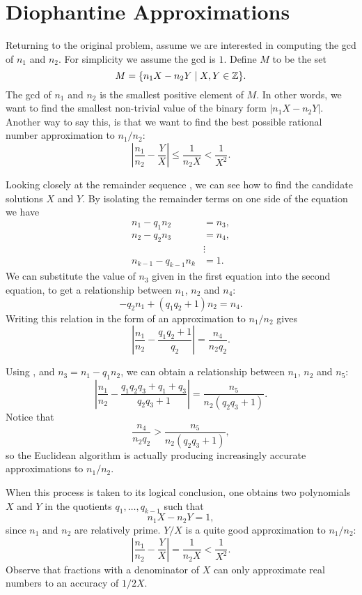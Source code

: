 
\section{Diophantine Approximations}
\label{Euclid:DA:Sec}

Returning to the original problem, assume we are interested in
computing the {\sc gcd} of $n_1$ and $n_2$.  For simplicity we assume
the {\sc gcd} is $1$.  Define $M$ to be the set
\[
M = \{ n_1 X - n_2 Y \mid X, Y \in \mathbb{Z} \}.
\]
The {\sc gcd} of $n_1$ and $n_2$ is the smallest positive element of $M$.
In other words, we want to find the smallest non-trivial value of the
binary form $|n_1 X - n_2 Y|$.  Another way to say this, is that we want
to find the best possible rational number approximation to $n_1/n_2$:
\[
\left|\frac{n_1}{n_2} - \frac{Y}{X}\right| \le \frac{1}{n_2 X} < \frac{1}{X^2}.
\]

Looking closely at the remainder sequence , we can see how to find
the candidate solutions $X$ and $Y$.  By isolating the remainder terms
on one side of the equation we have
\[
  \begin{aligned}
    n_1 - q_1 n_2 &= n_3,\\
    n_2 - q_2 n_3 &= n_4,\\
     &\vdots\\
    n_{k-1} - q_{k-1} n_{k} &= 1.
  \end{aligned}
\]
We can substitute the value of $n_3$ given in the first equation into
the second equation, to get a relationship between $n_1$, $n_2$ and
$n_4$:
\begin{equation}\label{Euclid:Int:D:Eq}
-q_2 n_1 + (q_1 q_2 + 1) n_2 = n_4.
\end{equation}
Writing this relation in the form of an approximation to $n_1/n_2$  gives
\[
\left|\frac{n_1}{n_2} - \frac{q_1 q_2 + 1}{q_2}\right| 
= \frac{n_4}{n_2 q_2}.
\]

Using , and $n_3 = n_1 - q_1 n_2$, we can
obtain a relationship between $n_1$, $n_2$ and $n_5$:
\[
\left|\frac{n_1}{n_2} - \frac{q_1 q_2 q_3 + q_1 + q_3}{q_2 q_3 +1 }\right| 
= \frac{n_5}{n_2 (q_2 q_3 +1)}.
\]
Notice that 
\[
\frac{n_4}{n_2 q_2} > \frac{n_5}{n_2 (q_2 q_3 +1)},
\]
so the Euclidean algorithm is actually producing increasingly accurate
approximations to $n_1/n_2$.

When this process is taken to its logical conclusion, one obtains two
polynomials $X$ and $Y$ in the quotients $q_1, \ldots, q_{k-1}$ such
that
\[
 n_1 X - n_2 Y = 1,
\]
since $n_1$ and $n_2$ are relatively prime.  $Y/X$ is a quite
good approximation to $n_1/n_2$:
\[
\left|\frac{n_1}{n_2} - \frac{Y}{X}\right| = \frac{1}{n_2 X} 
   <  \frac{1}{X^2}.
\]
Observe that fractions with a denominator of $X$ can only approximate
real numbers to an accuracy of $1/2X$.  

